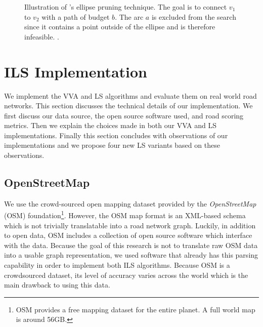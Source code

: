 \documentclass[honors]{union-cs-thesis}
\begin{document}
\begin{figure}
\begin{center}
\end{center}
\caption[Ellipse pruning technique]{Illustration of \citeauthor{lu2015arc}'s ellipse pruning technique. The goal is to connect $v_1$ to $v_2$ with a path of budget $b$. The arc $a$ is excluded from the search since it contains a point outside of the ellipse and is therefore infeasible. \cite{lu2015arc}.}
\label{fig:ellipse}
\end{figure}



\section{ILS Implementation}
\label{sec:ils-implementation}
We implement the VVA and LS algorithms and evaluate them on real world road networks. This section discusses the technical details of our implementation. We first discuss our data source, the open source software used, and road scoring metrics. Then we explain the choices made in both our VVA and LS implementations. Finally this section concludes with observations of our implementations and we propose four new LS variants based on these observations. 

\subsection{OpenStreetMap}
We use the crowd-sourced open mapping dataset provided by the \emph{OpenStreetMap} (OSM) foundation\footnote{OSM provides a free mapping dataset for the entire planet. A full world map is around 56GB.}\cite{osm}. However, the OSM map format is an XML-based schema which is not trivially translatable into a road network graph. Luckily, in addition to open data, OSM includes a collection of open source software which interface with the data. Because the goal of this research is not to translate raw OSM data into a usable graph representation, we used software that already has this parsing capability in order to implement both ILS algorithms. Because OSM is a crowdsourced dataset, its level of accuracy varies across the world which is the main drawback to using this data. 
\end{document}

